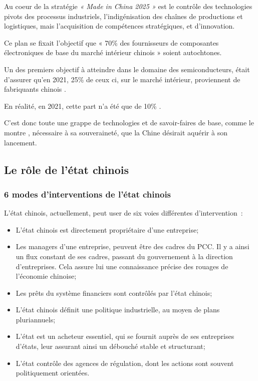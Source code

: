 \documentclass[a4paper]{article}
\begin{document}
Au coeur de la stratégie \textit{« Made in China 2025 »} est le contrôle des technologies pivots des processus industriels, l’indigénisation des chaînes de productions et logistiques, mais l’acquisition de compétences stratégiques, et d’innovation.

Ce plan se fixait l’objectif que « 70\% des fournisseurs de composantes électroniques de base du marché intérieur chinois » soient autochtones.

Un des premiers objectif à atteindre dans le domaine des semiconducteurs, était d’assurer qu’en 2021, 25\% de ceux ci, sur le marché intérieur, proviennent de fabriquants chinois \cite{Made_In_China_2025}.

En réalité, en 2021, cette part n’a été que de 10\% \cite{Futur_China_Semiconductor}.

C’est donc toute une grappe de technologies et de savoir-faires de base, comme le montre \cite{Made_In_China_2025}, nécessaire à sa souveraineté, que la Chine désirait aquérir à son lancement.

\subsection{Le rôle de l’état chinois}
\label{sec:org30c6878}
\subsubsection{6 modes d’interventions de l’état chinois}
\label{sec:orgecd012a}
L’état chinois, actuellement, peut user de six voies différentes d’intervention~:
\begin{itemize}
\item L’état chinois est directement propriétaire d’une entreprise;
\item Les managers d’une entreprise, peuvent être des cadres du PCC. Il y a ainsi un
flux constant de ses cadres, passant du gouvernement à la direction
d’entreprises. Cela assure lui une connaissance précise des rouages de
l’économie chinoise;
\item Les prêts du système financiers sont contrôlés par l’état chinois;
\item L’état chinois définit une politique industrielle, au moyen de plans pluriannuels;
\item L’état est un acheteur essentiel, qui se fournit auprès de ses entreprises
d’états, leur assurant ainsi un débouché stable et structurant;
\item L’état contrôle des agences de régulation, dont les actions sont souvent
politiquement orientées.
\end{itemize}
\end{document}
